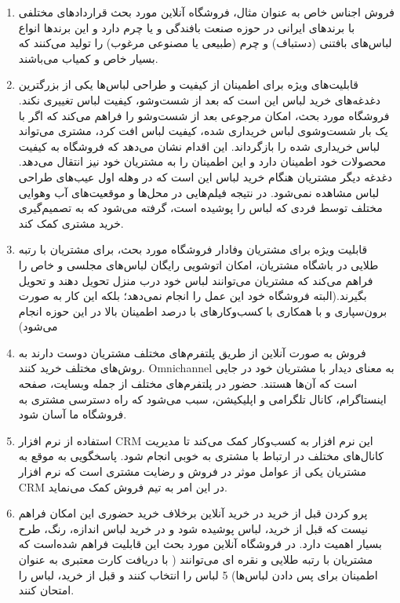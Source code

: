 \documentclass[14pt]{article}
\begin{document}
\begin{flushright}
\begin{enumerate}
\item فروش اجناس خاص
\newline
به عنوان مثال، فروشگاه آنلاین مورد بحث قرارداد‌های مختلفی با برند‌های ایرانی در حوزه صنعت بافندگی و یا چرم دارد و این برند‌ها انواع لباس‌های بافتنی (دستباف) و چرم (طبیعی یا مصنوعی مرغوب) را تولید می‌کنند که بسیار خاص و کمیاب می‌باشند.
\item قابلیت‌های ویژه برای اطمینان از کیفیت و طراحی لباس‌ها
\newline
یکی از بزرگترین دغدغه‌های خرید لباس این است که بعد از شست‌وشو، کیفیت لباس تغییری نکند. فروشگاه مورد بحث، امکان مرجوعی بعد از شست‌وشو را فراهم می‌کند که اگر با یک بار شست‌و‌شوی لباس خریداری شده، کیفیت لباس افت کرد، مشتری می‌تواند لباس خریداری شده را بازگرداند. این اقدام نشان می‌‌دهد که فروشگاه به کیفیت محصولات خود اطمینان دارد و این اطمینان را به مشتریان خود نیز انتقال می‌دهد.
دغدغه دیگر مشتریان هنگام خرید لباس این است که در وهله اول عیب‌های طراحی لباس مشاهده نمی‌شود. در نتیجه فیلم‌هایی در محل‌ها و موقعیت‌های آب وهوایی مختلف توسط فردی که لباس را پوشیده است، گرفته می‌شود که به تصمیم‌گیری خرید مشتری کمک کند.

\item قابلیت ویژه برای مشتریان وفادار
\newline
فروشگاه مورد بحث، برای مشتریان با رتبه طلایی در باشگاه مشتریان، امکان اتوشویی رایگان لباس‌های مجلسی و خاص را فراهم می‌کند که مشتریان می‌توانند لباس خود درب منزل تحویل دهند و تحویل بگیرند.(البته فروشگاه خود این عمل را انجام نمی‌دهد؛ بلکه این کار به صورت برون‌سپاری و با همکاری با کسب‌وکارهای با درصد اطمینان بالا در این حوزه انجام می‌شود)

\item فروش به صورت آنلاین از طریق پلتفرم‌های مختلف
\newline
مشتریان دوست دارند به روش‌های مختلف خرید کنند. Omnichannel به معنای دیدار با مشتریان خود در جایی است كه آن‌ها هستند. حضور در پلتفرم‌های مختلف از جمله وبسایت، صفحه اینستاگرام، کانال تلگرامی و اپلیکیشن، سبب می‌شود که راه دسترسی مشتری به فروشگاه ما آسان شود.

\item استفاده از نرم افزار CRM 
\newline
این نرم افزار به کسب‌وکار کمک می‌کند تا مدیریت کانال‌های مختلف در ارتباط با مشتری به خوبی انجام شود. پاسخگویی به موقع به مشتریان یکی از عوامل موثر در فروش و رضایت مشتری است که نرم افزار CRM در این امر به تیم فروش کمک می‌نماید.

\item پرو کردن قبل از خرید
\newline
در خرید آنلاین برخلاف خرید حضوری این امکان فراهم نیست که قبل از خرید، لباس پوشیده شود و در خرید لباس اندازه، رنگ، طرح بسیار اهمیت دارد. در فروشگاه آنلاین مورد بحث این قابلیت فراهم شده‌است که مشتریان با رتبه طلایی و نقره ای می‌توانند ( با دریافت کارت معتبری به عنوان اطمینان برای پس دادن لباس‌ها) 5 لباس را انتخاب کنند و قبل از خرید، لباس را امتحان کنند.



\end{enumerate}
\end{flushright}
\end{document}
